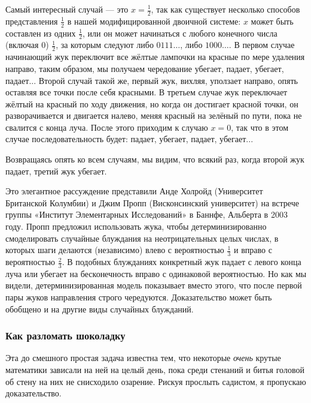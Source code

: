 Самый интересный случай --- это $x=\tfrac12$, так как существует несколько способов представления $\tfrac12$ в нашей модифицированной двоичной системе: $x$ может быть составлен из одних $\tfrac12$, или он может начинаться с любого конечного числа (включая 0) $\tfrac12$, за которым следуют либо $0111\dots$, либо $1000\dots$.
В первом случае начинающий жук переключит все жёлтые лампочки на красные по мере удаления направо, таким образом, мы получаем чередование  убегает, падает, убегает, падает...
Второй случай такой же, первый жук, вихляя, уползает направо, опять оставляя все точки после себя красными.
В третьем случае жук переключает жёлтый на красный по ходу движения, но когда он достигает красной точки, он разворачивается и двигается налево, меняя красный на зелёный по пути, пока не свалится с конца луча.
После этого приходим к случаю $x = 0$, так что в этом случае  последовательность будет: падает, убегает, падает, убегает...

Возвращаясь опять ко всем случаям, мы видим, что всякий раз, когда второй жук падает, третий жук убегает.
\heart

Это элегантное рассуждение представили
Анде Холройд (Университет Британской Колумбии) и Джим Пропп (Висконсинский университет) на встрече группы «Институт Элементарных Исследований» в Баннфе, Альберта в 2003 году. %
Пропп предложил использовать жука, чтобы детерминизированно смоделировать случайные блуждания на неотрицательных целых числах, в которых шаги делаются (независимо) влево с вероятностью $\tfrac13$ и вправо с вероятностью $\tfrac23$.
В подобных блужданиях конкретный жук падает с левого конца луча или убегает на бесконечность вправо с одинаковой вероятностью.
Но как мы видели, детерминизированная модель показывает вместо этого, что после первой пары жуков направления строго чередуются.
Доказательство может быть обобщено и на другие виды случайных блужданий.

\subsubsection*{Как разломать шоколадку}%

Эта до смешного простая задача известна тем, что некоторые \emph{очень} крутые математики зависали на ней на целый день, пока среди  стенаний и битья головой об стену на них не снисходило озарение.
Рискуя прослыть садистом, я пропускаю доказательство.
